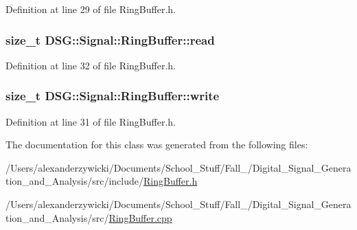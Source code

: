 Definition at line 29 of file Ring\+Buffer.\+h.

\hypertarget{classDSG_1_1Signal_1_1RingBuffer_afbefc0aade6d73024110d9788245958e}{
\subsubsection[{read}]{\setlength{\rightskip}{0pt plus 5cm}size\+\_\+t D\+S\+G\+::\+Signal\+::\+Ring\+Buffer\+::read\hspace{0.3cm}{\ttfamily [protected]}}}\label{classDSG_1_1Signal_1_1RingBuffer_afbefc0aade6d73024110d9788245958e}


Definition at line 32 of file Ring\+Buffer.\+h.

\hypertarget{classDSG_1_1Signal_1_1RingBuffer_ac5309c59a64526cef800f144268a3dbd}{
\subsubsection[{write}]{\setlength{\rightskip}{0pt plus 5cm}size\+\_\+t D\+S\+G\+::\+Signal\+::\+Ring\+Buffer\+::write\hspace{0.3cm}{\ttfamily [protected]}}}\label{classDSG_1_1Signal_1_1RingBuffer_ac5309c59a64526cef800f144268a3dbd}


Definition at line 31 of file Ring\+Buffer.\+h.



The documentation for this class was generated from the following files\+:\begin{DoxyCompactItemize}
\item 
/\+Users/alexanderzywicki/\+Documents/\+School\+\_\+\+Stuff/\+Fall\+\_/\+Digital\+\_\+\+Signal\+\_\+\+Generation\+\_\+and\+\_\+\+Analysis/src/include/\hyperlink{RingBuffer_8h}{Ring\+Buffer.\+h}\item 
/\+Users/alexanderzywicki/\+Documents/\+School\+\_\+\+Stuff/\+Fall\+\_/\+Digital\+\_\+\+Signal\+\_\+\+Generation\+\_\+and\+\_\+\+Analysis/src/\hyperlink{RingBuffer_8cpp}{Ring\+Buffer.\+cpp}\end{DoxyCompactItemize}
